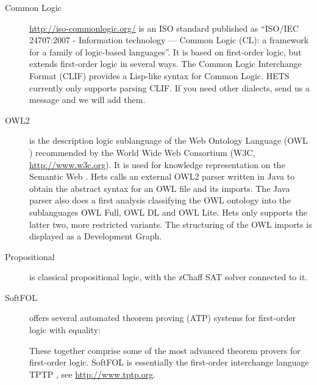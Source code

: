 \documentclass{article}
\newcommand{\normalTEXTSC}[2]{{#1\scriptsize#2}}
\newcommand     {\Hets}{\normalTEXTSC{H}{ETS}\xspace}
\newcommand     {\SPASS}{\normalTEXTSC{S}{PASS}\xspace}
\begin{document}
\begin{description}


\item[Common Logic] \url{http://iso-commonlogic.org/}
   is an ISO standard published as ``ISO/IEC 24707:2007 - Information technology — Common Logic (CL): a framework for a family of logic-based languages''. It is based on first-order logic, but extends first-order
logic in several ways.   The Common Logic
  Interchange Format (CLIF) provides a Lisp-like syntax for Common
  Logic.  \Hets currently only supports parsing CLIF. If you need
  other dialects, send us a message and we will add them.

\item[OWL2] is the description logic sublanguage of the Web Ontology Language (OWL \cite{McGvHa:owl04}) recommended by the
  World Wide Web Consortium (W3C, \url{http://www.w3c.org}). It is
  used for knowledge representation on the Semantic Web
  \cite{berners:2001:SWeb}.
Hets calls an external OWL2 parser
  written in Java to obtain the abstract syntax for an OWL file and its
  imports. The Java parser also does a first analysis classifying
  the OWL ontology into the sublanguages OWL Full, OWL DL and OWL
  Lite.
 Hets only supports the latter two, more restricted variants.
The
  structuring of the OWL imports is displayed as a Development Graph.

\item[Propositional] is classical propositional logic, with
the zChaff SAT solver \cite{Herbstritt03} connected to it.

\item[SoftFOL] \cite{LuettichEA06a} offers several automated theorem
  proving (ATP) systems for first-order logic with equality: 
  These together comprise some of the most advanced theorem provers
  for first-order logic. SoftFOL is essentially the first-order
  interchange language TPTP \cite{DBLP:conf/lpar/Sutcliffe10},
see \url{http://www.tptp.org}.


\end{description}
\end{document}

